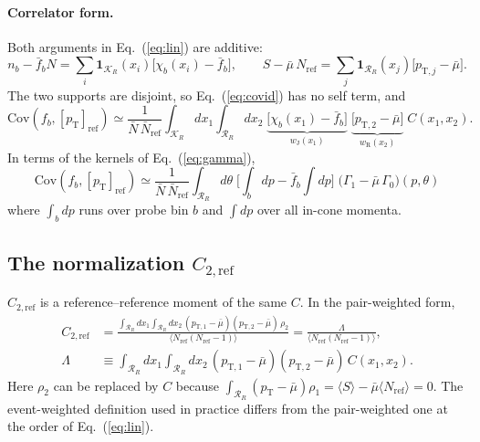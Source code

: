 \documentclass[11pt,a4paper]{article}
\newcommand{\pT}{p_\mathrm{T}}
\newcommand{\mpt}{[\pT]_\mathrm{ref}}
\newcommand{\Ctwo}{C_{2,\mathrm{ref}}}
\newcommand{\K}{\mathcal{K}_R}
\newcommand{\Rr}{\mathcal{R}_R}
\newcommand{\Nref}{N_\mathrm{ref}}
\begin{document}
\paragraph{Correlator form.}
Both arguments in Eq.~(\ref{eq:lin}) are additive:
\begin{equation}
n_b-\bar f_b N=\sum_i \mathbf{1}_{\K}(x_i)\big[\chi_b(x_i)-\bar f_b\big],\qquad
S-\bar\mu\,\Nref=\sum_j \mathbf{1}_{\Rr}(x_j)\big[p_{\mathrm{T},j}-\bar\mu\big].
\end{equation}
The two supports are disjoint, so Eq.~(\ref{eq:covid}) has no self term, and
\begin{equation}
\mathrm{Cov}(f_b,\mpt)\simeq\frac{1}{\bar N\,\bar N_\mathrm{ref}}
\int_{\K}\!dx_1\!\int_{\Rr}\!dx_2\;
\underbrace{\big[\chi_b(x_1)-\bar f_b\big]}_{w_\mathrm{J}(x_1)}\;
\underbrace{\big[p_{\mathrm{T},2}-\bar\mu\big]}_{w_\mathrm{R}(x_2)}\;C(x_1,x_2).
\label{eq:cov_C}
\end{equation}
In terms of the kernels of Eq.~(\ref{eq:gamma}),
\begin{equation}
\boxed{\;\mathrm{Cov}(f_b,\mpt)\simeq\frac{1}{\bar N\,\bar N_\mathrm{ref}}\int_{\Rr}\!d\theta\;
\Big[\int_{b}\!dp-\bar f_b\!\int\!dp\Big]\;\big(\Gamma_1-\bar\mu\,\Gamma_0\big)(p,\theta)\;}
\label{eq:cov_gamma}
\end{equation}
where $\int_b dp$ runs over probe bin $b$ and $\int dp$ over all in-cone momenta.

\subsection{The normalization $\Ctwo$}
$\Ctwo$ is a reference--reference moment of the same $C$. In the pair-weighted form,
\begin{align}
\Ctwo&=\frac{\int_{\Rr}\!dx_1\int_{\Rr}\!dx_2\,(p_{\mathrm{T},1}-\bar\mu)(p_{\mathrm{T},2}-\bar\mu)\,\rho_2}{\langle\Nref(\Nref-1)\rangle}
=\frac{\Lambda}{\langle\Nref(\Nref-1)\rangle},\label{eq:c2}\\
\Lambda&\equiv\int_{\Rr}\!dx_1\int_{\Rr}\!dx_2\,(p_{\mathrm{T},1}-\bar\mu)(p_{\mathrm{T},2}-\bar\mu)\,C(x_1,x_2).\nonumber
\end{align}
Here $\rho_2$ can be replaced by $C$ because $\int_{\Rr}(\pT-\bar\mu)\rho_1=\langle S\rangle-\bar\mu\langle\Nref\rangle=0$. The event-weighted definition used in practice differs from the pair-weighted one at the order of Eq.~(\ref{eq:lin}).
\end{document}

